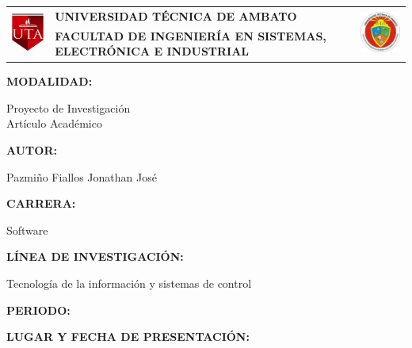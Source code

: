 \begin{titlepage}
	\begin{center}
		\begin{tabular}{l  p{}  l}
			\multirow{2}{*}{
				\includegraphics[width=20mm]{resources/images/logo-uta-rojo.png}
			}                                                             &
			\bfseries\uppercase{\centering Universidad Técnica de Ambato} &
			\multirow{2}{*}{
				\includegraphics[width=25mm]{resources/images/logo-fisei-feo.jpeg}
			}                                                                                                                                                              \\
			                                                              & \bfseries\uppercase{\centering Facultad de Ingeniería en Sistemas, Electrónica e Industrial} & \\
		\end{tabular}
		\vspace{2cm}
	\end{center}
	{\textbf{MODALIDAD: }\par}
	\begin{center}
		Proyecto de Investigación  \\
		Artículo Académico \fbox{\phantom{X}}
	\end{center}
	{\textbf{AUTOR: }\par}
	\begin{center}
		Pazmiño Fiallos Jonathan José
	\end{center}
	{\textbf{CARRERA: }\par}
	\begin{center}
		Software
	\end{center}
	{\textbf{LÍNEA DE INVESTIGACIÓN: }\par}
	\begin{center}
		Tecnología de la información y sistemas de control
	\end{center}
	{\textbf{PERIODO: }\par}
	\begin{center}
		\periodo
	\end{center}
	{\textbf{LUGAR Y FECHA DE PRESENTACIÓN: }\par}
	\begin{center}
	\end{center}
	\vfill
\end{titlepage}
